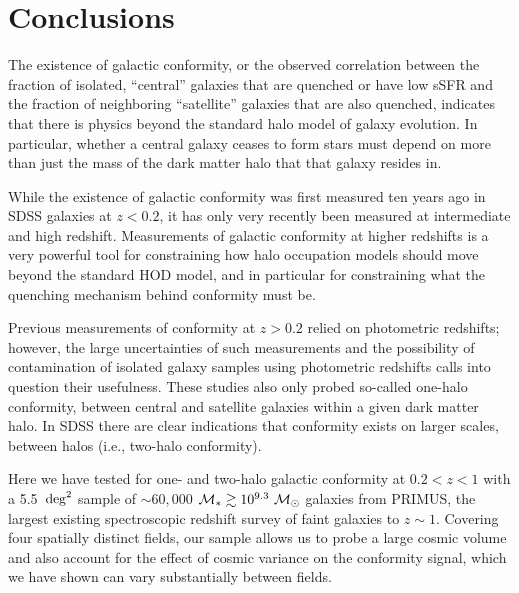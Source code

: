 
\section{Conclusions}\label{sec:conclusion}

The existence of galactic conformity, or the observed correlation between 
the fraction of isolated, ``central'' galaxies that are quenched or have 
low sSFR and the fraction of neighboring ``satellite'' galaxies that are also
quenched, indicates that there is physics beyond the standard halo model 
of galaxy evolution.  In particular, whether a central galaxy ceases to 
form stars must depend on more than just the mass of the dark matter halo 
that that galaxy resides in.  

While the existence of galactic conformity was first measured ten years ago
in SDSS galaxies at $z<0.2$, it has only very recently been measured at 
intermediate and high redshift.  
Measurements of galactic conformity at higher redshifts is a very powerful 
tool for constraining how halo occupation models should move beyond the 
standard HOD model, and in particular for constraining what the quenching 
mechanism behind conformity must be.  

Previous measurements of conformity at $z>0.2$ relied on photometric 
redshifts; however, the large uncertainties of such measurements and the 
possibility of contamination of isolated galaxy samples using photometric
redshifts calls into question their usefulness.  These studies also only
probed so-called one-halo conformity, between central and satellite galaxies
within a given dark matter halo.  In SDSS there are clear indications that
conformity exists on larger scales, between halos (i.e., two-halo conformity).

Here we have tested for one- and two-halo galactic conformity at ${0.2<z<1}$ 
with a 5.5~$\degsq$ sample of $\sim60,000$ ${\mstar\gtrsim10^{9.3}~\msun}$ 
galaxies from PRIMUS, the largest existing spectroscopic redshift survey 
of faint galaxies to ${z\sim1}$.
Covering four spatially distinct fields, our sample allows us to probe a large 
cosmic volume and also account for the effect of cosmic variance on the conformity signal,
which we have shown can vary substantially between fields.

